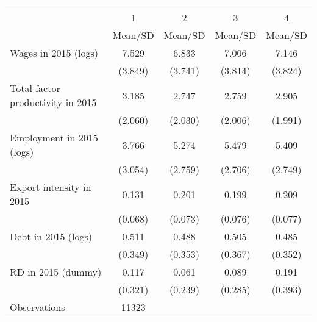 {
\def\sym#1{\ifmmode^{#1}\else\(^{#1}\)\fi}
\begin{tabular}{l*{4}{c}}
\hline\hline
                    &\multicolumn{4}{c}{}                               \\
                    &           1&           2&           3&           4\\
                    &     Mean/SD&     Mean/SD&     Mean/SD&     Mean/SD\\
\hline
Wages in 2015 (logs)&       7.529&       6.833&       7.006&       7.146\\
                    &     (3.849)&     (3.741)&     (3.814)&     (3.824)\\
Total factor productivity in 2015&       3.185&       2.747&       2.759&       2.905\\
                    &     (2.060)&     (2.030)&     (2.006)&     (1.991)\\
Employment in 2015 (logs)&       3.766&       5.274&       5.479&       5.409\\
                    &     (3.054)&     (2.759)&     (2.706)&     (2.749)\\
Export intensity in 2015&       0.131&       0.201&       0.199&       0.209\\
                    &     (0.068)&     (0.073)&     (0.076)&     (0.077)\\
Debt in 2015 (logs) &       0.511&       0.488&       0.505&       0.485\\
                    &     (0.349)&     (0.353)&     (0.367)&     (0.352)\\
RD in 2015 (dummy)  &       0.117&       0.061&       0.089&       0.191\\
                    &     (0.321)&     (0.239)&     (0.285)&     (0.393)\\
\hline
Observations        &       11323&            &            &            \\
\hline\hline
\end{tabular}
}
